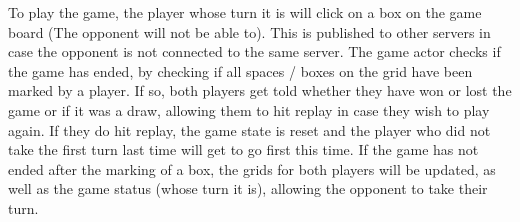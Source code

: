 \documentclass[]{final}
\begin{document}
To play the game, the player whose turn it is will click on a box on the game board
(The opponent will not be able to). This is published to other servers in case the
opponent is not connected to the same server. The game actor checks if the game
has ended, by checking if all spaces / boxes on the grid have been marked by a player.
If so, both players get told whether they have won or lost the game or if it was a draw,
allowing them to hit replay in case they wish to play again. If they do hit replay,
the game state is reset and the player who did not take the first turn last time
will get to go first this time. If the game has not ended after the marking of a box,
the grids for both players will be updated, as well as the game status (whose turn it is),
allowing the opponent to take their turn.

\newpage
\end{document}
